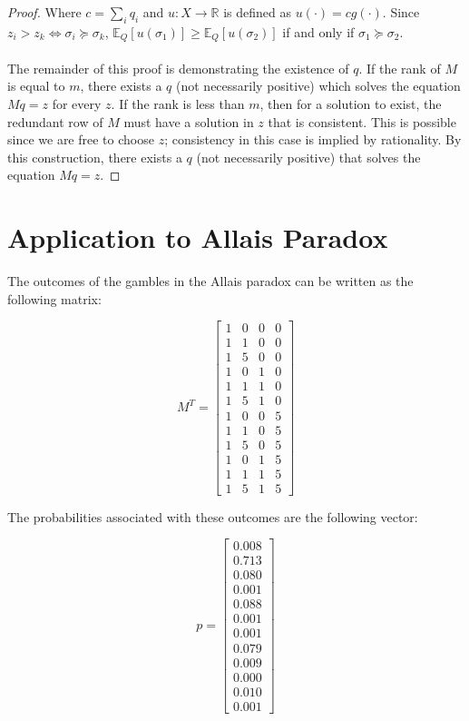 \documentclass{article}
\begin{document}
\begin{proof}
Where \(c=\sum_i q_i\) and \(u:X \to \mathbb{R}\) is defined as \( u(\cdot)=c g(\cdot)\). Since \(z_i > z_k \Leftrightarrow \sigma_i \succeq \sigma_k\), \(\mathbb{E}_Q\left[u(\sigma_1)\right] \geq \mathbb{E}_Q\left[u(\sigma_2)\right]\) if and only if \(\sigma_1 \succeq \sigma_2\).  
\\
\\
The remainder of this proof is demonstrating the existence of \(q\).  If the rank of \(M\) is equal to \(m\), there exists a \(q\) (not necessarily positive) which solves the equation \(Mq=z\) for every \(z\).  If the rank is less than \(m\), then for a solution to exist, the redundant row of \(M\) must have a solution in \(z\) that is consistent.  This is possible since we are free to choose \(z\); consistency in this case is implied by rationality. By this construction, there exists a \(q\) (not necessarily positive) that solves the equation \(Mq=z\).  





\end{proof}


\section{Application to Allais Paradox}

The outcomes of the gambles in the Allais paradox can be written as the following matrix:

\[M^T=\begin{bmatrix}
1 & 0 & 0 & 0 \\
1 & 1 & 0 & 0 \\
1 & 5 & 0 & 0 \\
1 & 0 & 1 & 0 \\
1 & 1 & 1 & 0 \\
1 & 5 & 1 & 0 \\
1 & 0 & 0 & 5 \\
1 & 1 & 0 & 5 \\
1 & 5 & 0 & 5 \\
1 & 0 & 1 & 5 \\
1 & 1 & 1 & 5 \\
1 & 5 & 1 & 5
\end{bmatrix}\]

The probabilities associated with these outcomes are the following vector:

\[p=\begin{bmatrix}
0.008 \\
0.713 \\
0.080 \\
0.001 \\
0.088 \\
0.001 \\
0.001 \\
0.079 \\
0.009 \\
0.000 \\
0.010 \\
0.001
\end{bmatrix}\]
\end{document}
